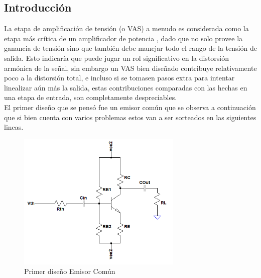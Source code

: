 

\subsection{Introducción}
La etapa de amplificación de tensión (o VAS) a menudo es considerada como la etapa más crítica de un amplificador de potencia , dado que no solo provee la ganancia de tensión sino que también debe manejar todo el rango de la tensión de salida. Esto indicaría que puede jugar un rol significativo en la distorsión armónica de la señal, sin embargo un VAS bien diseñado contribuye relativamente poco a la distorsión total, e incluso si se tomasen pasos extra para intentar linealizar aún más la salida, estas contribuciones comparadas con las hechas en una etapa de entrada, son completamente despreciables.\\

El primer diseño que se pensó fue un emisor común que se observa a continuación que si bien  cuenta con varios problemas estos van  a ser sorteados en las siguientes lineas.
\begin{figure}[H]
\centering
	\includegraphics[width=0.7\textwidth]{ImagenesGain-Stage/ec1.png}
	\caption{Primer diseño Emisor Común}
	\label{fig:ec1}
\end{figure}


